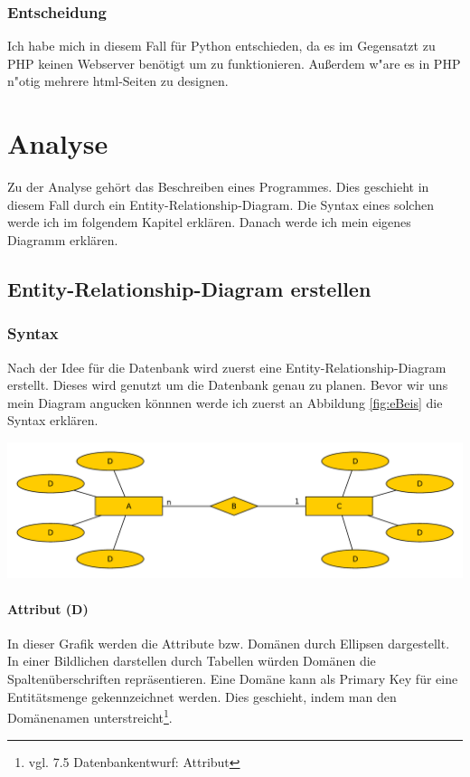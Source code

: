 \documentclass[a4paper, 12pt]{article}
\theoremstyle{plain}
\theoremstyle{definition}
\begin{document}
	\subsubsection{Entscheidung}
	Ich habe mich in diesem Fall für Python entschieden, da es im Gegensatzt zu PHP keinen Webserver benötigt um zu funktionieren. Außerdem w"are es in PHP n"otig mehrere html-Seiten zu designen.
	
	\section{Analyse}
	\label{sec:loes}
	Zu der Analyse gehört das Beschreiben eines Programmes. Dies geschieht in diesem Fall durch ein Entity-Relationship-Diagram. Die Syntax eines solchen werde ich im folgendem Kapitel erklären. Danach werde ich mein eigenes Diagramm erklären.
	
	\subsection{Entity-Relationship-Diagram erstellen}
	\label{sec:ERDers}
	\subsubsection{Syntax}
	\label{sec:ERSyntax}
	Nach der Idee für die Datenbank wird zuerst eine Entity-Relationship-Diagram erstellt. Dieses wird genutzt um die Datenbank genau zu planen. Bevor wir uns mein Diagram angucken könnnen werde ich zuerst an Abbildung \ref{fig:eBeis} die Syntax erklären.
	\begin{center}
	\includegraphics[scale=0.6, ]{EntityBeis.pdf}
	\label{fig:eBeis}
	\end{center}
	
	\paragraph{Attribut (D)} In dieser Grafik werden die Attribute bzw. Domänen durch Ellipsen dargestellt. In einer Bildlichen darstellen durch Tabellen würden Domänen die Spaltenüberschriften repräsentieren. Eine Domäne kann als Primary Key für eine Entitätsmenge gekennzeichnet werden. Dies geschieht, indem man den Domänenamen unterstreicht\footnote{vgl. \cite{Jarosch2010} 7.5 Datenbankentwurf: Attribut}.
	
\end{document}
